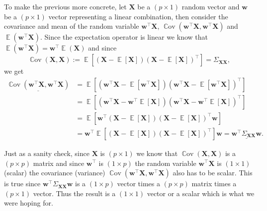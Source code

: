 \documentclass[a4paper, 12pt]{scrartcl}
\newcommand{\cov}{\operatorname{\mathbb{C}ov}}
\newcommand{\ex}{\operatorname{\mathbb{E}}}
\newcommand{\bfw}{\mathbf{w}}
\newcommand{\bfX}{\mathbf{X}}
\begin{document}
To make the previous more concrete, let $\bfX$ be a $\left(p \times 1\right)$ random vector and $\bfw$ be a $\left(p \times 1\right)$ vector representing a linear combination, then consider the covariance and mean of the random variable $\bfw^\intercal\bfX$, $\cov\left(\bfw^\intercal\bfX,\bfw^\intercal\bfX\right)$ and $\ex\left(\bfw^\intercal\bfX\right).$
Since the expectation operator is linear we know that $\ex\left(\bfw^\intercal\bfX\right) = \bfw^\intercal\ex\left(\bfX\right)$ and since
\begin{equation*}
\cov\left(\bfX, \bfX\right):=\ex\left[\left(\bfX-\ex\left[\bfX\right]\right)\left(\bfX-\ex\left[\bfX\right]\right)^\intercal\right]=\Sigma_{\bfX \bfX},
\end{equation*}
we get
\begin{align*}
\underline{\cov\left(\bfw^\intercal\bfX, \bfw^\intercal\bfX\right)}&=\ex\left[\left(\bfw^\intercal\bfX-\ex\left[\bfw^\intercal\bfX\right]\right)\left(\bfw^\intercal\bfX-\ex\left[\bfw^\intercal\bfX\right]\right)^\intercal\right]\\
&=\ex\left[\left(\bfw^\intercal\bfX-\bfw^\intercal\ex\left[\bfX\right]\right)\left(\bfw^\intercal\bfX-\bfw^\intercal\ex\left[\bfX\right]\right)^\intercal\right]\\
&=\ex\left[\bfw^\intercal\left(\bfX-\ex\left[\bfX\right]\right)\left(\bfX-\ex\left[\bfX\right]\right)^\intercal\bfw\right]\\
&=\bfw^\intercal\ex\left[\left(\bfX-\ex\left[\bfX\right]\right)\left(\bfX-\ex\left[\bfX\right]\right)^\intercal\right]\bfw=\underline{\bfw^\intercal\Sigma_{\bfX \bfX}\bfw}.
\end{align*}

Just as a sanity check, since $\bfX$ is $\left(p\times 1\right)$ we know that $\cov\left(\bfX, \bfX \right)$ is a $\left(p\times p\right)$ matrix and since $\bfw^\intercal$ is $\left(1\times p\right)$ the random variable $\bfw^\intercal\bfX$ is $\left(1 \times 1\right)$ (scalar) the covariance (variance) $\cov\left(\bfw^\intercal\bfX, \bfw^\intercal\bfX\right)$ also has to be scalar. This is true since $\bfw^\intercal\Sigma_{\bfX \bfX}\bfw$ is a $\left(1\times p\right)$ vector times a $\left(p\times p\right)$ matrix times a $\left(p\times 1\right)$ vector. Thus the result is a $\left(1\times 1\right)$ vector or a scalar which is what we were hoping for.
\end{document}
